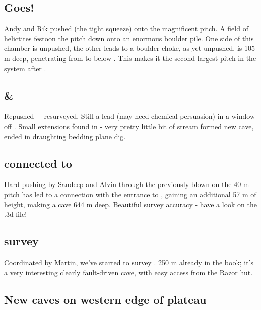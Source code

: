 \subsection{\protect{} Goes!}

Andy and Rik pushed  (the tight squeeze) onto the magnificent
 pitch. A field of helictites festoon the pitch down onto an
enormous boulder pile. One side of this chamber is unpushed, the other
leads to a boulder choke, as yet unpushed.  is 105 m
deep, penetrating from  to below . This
makes it the second largest pitch in the system after .

\subsection{\protect{} \& \protect{}}

Repushed + resurveyed. Still a lead (may need chemical persuasion) in a
window off . Small extensions found in  - very pretty little bit of
stream formed new cave, ended in draughting bedding plane dig.

\subsection{\protect{} connected to \protect{}}

Hard pushing by Sandeep and Alvin through the previously blown  on the 40 m  pitch has led to a connection with the 
entrance to , gaining  an additional 57
m of height, making a cave 644 m deep. Beautiful survey accuracy - have
a look on the .3d file!

\subsection{\protect{} survey}

Coordinated by Martin, we've started to survey . 250 m
already in the book; it's a very interesting clearly fault-driven cave,
with easy access from the Razor hut.

\subsection{New caves on western edge of plateau}


